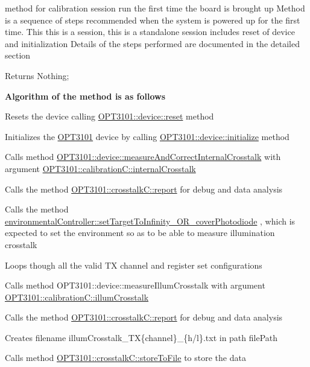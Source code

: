 method for calibration session run the first time the board is brought up Method is a sequence of steps recommended when the system is powered up for the first time. This this is a session, this is a standalone session includes reset of device and initialization Details of the steps performed are documented in the detailed section 

\begin{DoxyReturn}{Returns}
Nothing; 
\end{DoxyReturn}
{\bfseries Algorithm of the method is as follows}


\begin{DoxyItemize}
\item Resets the device calling \mbox{\hyperlink{class_o_p_t3101_1_1device_a1d37b22f535d8130c7f24799f7fa3c33}{O\+P\+T3101\+::device\+::reset}} method
\item Initializes the \mbox{\hyperlink{namespace_o_p_t3101}{O\+P\+T3101}} device by calling \mbox{\hyperlink{class_o_p_t3101_1_1device_ae3b7fb4f9a8f1dee330523e034aa9460}{O\+P\+T3101\+::device\+::initialize}} method
\item Calls method \mbox{\hyperlink{class_o_p_t3101_1_1device_a44f832d6edbfb26db079ddba4debfdba}{O\+P\+T3101\+::device\+::measure\+And\+Correct\+Internal\+Crosstalk}} with argument \mbox{\hyperlink{class_o_p_t3101_1_1calibration_c_a4df5b876541e9b33eadf6290fe08b7e5}{O\+P\+T3101\+::calibration\+C\+::internal\+Crosstalk}}
\item Calls the method \mbox{\hyperlink{class_o_p_t3101_1_1crosstalk_c_a8a611602b13d6f3e97049696ddebe209}{O\+P\+T3101\+::crosstalk\+C\+::report}} for debug and data analysis
\item Calls the method \mbox{\hyperlink{classenvironmental_controller_a8a1fb44efff232844f00de18e174d4ce}{environmental\+Controller\+::set\+Target\+To\+Infinity\+\_\+\+O\+R\+\_\+cover\+Photodiode}} , which is expected to set the environment so as to be able to measure illumination crosstalk
\item Loops though all the valid TX channel and register set configurations
\item Calls method O\+P\+T3101\+::device\+::measure\+Illum\+Crosstalk with argument \mbox{\hyperlink{class_o_p_t3101_1_1calibration_c_ac09121c7057093506de63d6e2ea3a4b7}{O\+P\+T3101\+::calibration\+C\+::illum\+Crosstalk}}
\item Calls the method \mbox{\hyperlink{class_o_p_t3101_1_1crosstalk_c_a8a611602b13d6f3e97049696ddebe209}{O\+P\+T3101\+::crosstalk\+C\+::report}} for debug and data analysis
\item Creates filename illum\+Crosstalk\+\_\+\+TX\{channel\}\+\_\+\{h/l\}.txt in path file\+Path
\item Calls method \mbox{\hyperlink{class_o_p_t3101_1_1crosstalk_c_a7d887d736dd5a3aa9dd81224e67240b8}{O\+P\+T3101\+::crosstalk\+C\+::store\+To\+File}} to store the data 
\end{DoxyItemize}\mbox{\label{class_o_p_t3101_1_1device_a6b44ee9769ae8a2debff7b475bccdfe4}} 

